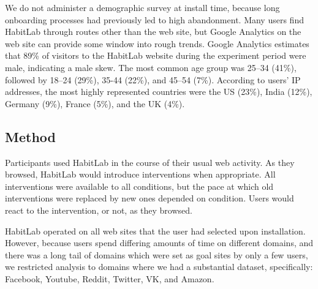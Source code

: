 

We do not administer a demographic survey at install time, because long onboarding processes had previously led to high abandonment. Many users find HabitLab through routes other than the web site, but Google Analytics on the web site can provide some window into rough trends. Google Analytics estimates that 89\% of visitors to the HabitLab website during the experiment period were male, indicating a male skew. The most common age group was 25--34 (41\%), followed by 18--24 (29\%), 35-44 (22\%), and 45--54 (7\%). According to users' IP addresses, the most highly represented countries were the US (23\%), India (12\%), Germany (9\%), France (5\%), and the UK (4\%).



\subsection{Method}

Participants used HabitLab in the course of their usual web activity. As they browsed, HabitLab would introduce interventions when appropriate. All interventions were available to all conditions, but the pace at which old interventions were replaced by new ones depended on condition. Users would react to the intervention, or not, as they browsed. %

HabitLab operated on all web sites that the user had selected upon installation. However, because users spend differing amounts of time on different domains, and there was a long tail of domains which were set as goal sites by only a few users, we restricted analysis to domains where we had a substantial dataset, specifically: Facebook, Youtube, Reddit, Twitter, VK, and Amazon. %

